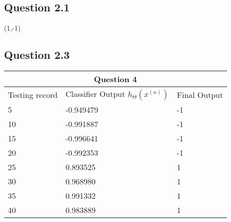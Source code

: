 \documentclass[10pt]{article}
\begin{document}
\bigskip

\subsection*{Question 2.1}
(1,-1)

\subsection*{Question 2.3}
\begin{tabular}{ 
|p{3cm}||p{3cm}|p{3cm}|  }
 \hline
 \multicolumn{3}{|c|}{Question 4} \\
 \hline
 
 Testing record & Classifier Output $h_{\Theta}(x^{(n)})$ & Final Output\\
 \hline
 5&-0.949479&-1\\
 10&-0.991887&-1\\
 15&-0.996641&-1\\
 20&-0.992353&-1\\
 25&0.893525&1\\
 30&0.968980&1\\
 35&0.991332&1\\
 40&0.983889&1\\
 \hline
 
\end{tabular}
\end{document}
